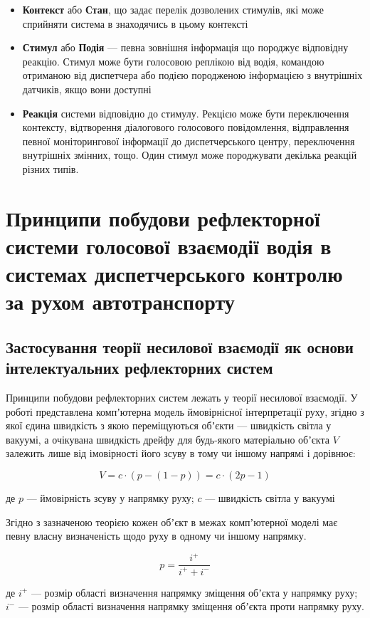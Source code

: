 \begin{itemize}
	\item \textbf{Контекст} або \textbf{Стан}, що задає перелік дозволених стимулів, які може сприйняти система в знаходячись в цьому контексті
	\item \textbf{Стимул} або \textbf{Подія} --- певна зовнішня інформація що породжує відповідну реакцію. Стимул може бути голосовою реплікою від водія, командою отриманою від диспетчера або подією породженою інформацією з внутрішніх датчиків, якщо вони доступні
	\item \textbf{Реакція} системи відповідно до стимулу. Рекцією може бути переключення контексту, відтворення діалогового голосового повідомлення, відправлення певної моніторингової інформації до диспетчерського центру,  переключення внутрішніх змінних, тощо. Один стимул може породжувати декілька реакцій різних типів.
\end{itemize}


\section{Принципи побудови рефлекторної системи голосової взаємодії водія в системах диспетчерського контролю за рухом автотранспорту} \label{sect2_4}

\subsection{Застосування теорії несилової взаємодії як основи інтелектуальних рефлекторних систем} \label{subsect2_4_1}

Принципи побудови рефлекторних систем лежать у теорії несилової взаємодії. У роботі \cite{Teslia_2010} представлена компʼютерна модель ймовірнісної інтерпретації руху, згідно з якої єдина швидкість з якою переміщуються обʼєкти --- швидкість світла у вакуумі, а очікувана швидкість дрейфу для будь-якого матеріально обʼєкта $V$ залежить лише від імовірності його зсуву в тому чи іншому напрямі і дорівнює:

\[
V=c\cdot(p-(1-p))=c\cdot(2p-1)
\]

\noindent
де $p$ --- ймовірність зсуву у напрямку руху; $c$ --- швидкість світла у вакуумі

Згідно з зазначеною теорією кожен обʼєкт в межах компʼютерної моделі має певну власну визначеність щодо руху в одному чи іншому напрямку. 

\[
p=\frac{i^+}{i^+ + i^-}
\]

\noindent
де $i^+$ --- розмір області визначення напрямку зміщення обʼєкта у напрямку руху; $i^-$ --- розмір області визначення напрямку зміщення обʼєкта проти напрямку руху.

